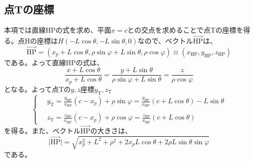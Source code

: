 \documentclass[11pt, titlepage, openany]{ltjsbook}
\begin{document}
\subsection{点Tの座標}
本項では直線HPの式を求め、平面$x=c$との交点を求めることで点Tの座標を得る。点Hの座標は$H(-L\cos\theta, -L\sin\theta, 0)$なので、ベクトル$\overrightarrow{\mathrm{HP}}$は、
\begin{equation}
    \overrightarrow{\mathrm{HP}} = (x_p + L\cos\theta, \rho\sin\varphi + L\sin\theta, \rho\cos\varphi) \equiv (x_{\mathrm{HP}}, y_{\mathrm{HP}}, z_{\mathrm{HP}})
\end{equation}
である。よって直線HPの式は、
\begin{equation}
    \frac{x + L\cos\theta}{x_p + L\cos\theta} = \frac{y + L\sin\theta}{\rho\sin\varphi + L\sin\theta} = \frac{z}{\rho\cos\varphi}
\end{equation}
となる。よって点Tの$y,z$座標$y_{\mathrm{T}},z_{\mathrm{T}}$
\begin{equation}
\left\{ \,
    \begin{aligned}
    & y_{\mathrm{T}} = \frac{y_{\mathrm{HP}}}{x_{\mathrm{HP}}}(c - x_p) + \rho\sin\varphi = \frac{y_{\mathrm{HP}}}{x_{\mathrm{HP}}}(c + L\cos\theta) - L\sin\theta\\
    &\\
    & z_{\mathrm{T}} = \frac{z_{\mathrm{HP}}}{x_{\mathrm{HP}}}(c - x_p) + \rho\cos\varphi = \frac{z_{\mathrm{HP}}}{x_{\mathrm{HP}}}(c + L\cos\theta)
    \end{aligned}
\right.
\end{equation}
を得る。また、ベクトル$\overrightarrow{\mathrm{HP}}$の大きさは、
\begin{equation}
    \lvert \overrightarrow{\mathrm{HP}} \rvert = \sqrt{ x_p^2 + L^2 + \rho^2 + 2x_p L\cos\theta +2\rho L\sin\theta\sin\varphi }
\end{equation}
である。
\end{document}
